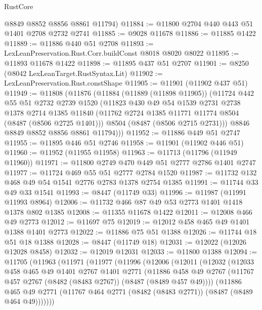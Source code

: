 \begin{lexlean}{RustCore}
\begin{coremodule}
      @8849
      @8852
      @8856
      @8861
      @11794)
@11884 := @11800 @2704 @440 @443 @51 @1401 @2708 @2732 @2741
@11885 := @9028 @11678
@11886 := @11885 @1422
@11889 := @11886 @440 @51 @2708
@11893 := LexLeanPreservation.Rust.Corr.buildConst @8018 @8020 @8022
@11895 := @11893 @11678 @1422
@11898 := @11895 @437 @51 @2707
@11901 := @8250 (@8042 LexLeanTarget.RustSyntax.Lit)
@11902 := LexLeanPreservation.Rust.constShape
@11905 := @11901 (@11902 @437 @51)
@11949 := @11808
    (@11876
      (@11884
        (@11889 (@11898 @11905))
        (@11724
          @442
          @55
          @51
          @2732
          @2739
          @1520
          (@11823
            @430
            @49
            @54
            @1539
            @2731
            @2738
            @1378
            @2714
            @1385
            @11840
            (@11762 @2724 @1385 @11771 @11774 @8504 (@8487 (@8506 @2725 @1401)))
            @8504
            (@8487 (@8506 @2715 @2731)))
          @8846
          @8849
          @8852
          @8856
          @8861
          @11794)))
@11952 := @11886 @449 @51 @2747
@11955 := @11895 @446 @51 @2746
@11958 := @11901 (@11902 @446 @51)
@11960 := @11952 (@11955 @11958)
@11963 := @11713 (@11796 (@11949 @11960))
@11971 := @11800 @2749 @470 @449 @51 @2777 @2786 @1401 @2747
@11977 := @11724 @469 @55 @51 @2777 @2784 @1520
@11987 := @11732 @132 @468 @49 @54 @1541 @2776 @2783 @1378 @2754 @1385
@11991 := @11744 @33 @49 @33 @1541
@11993 := @8447 (@11749 @33)
@11996 := @11987 (@11991 @11993 @8964)
@12006 := @11732 @466 @87 @49 @53 @2773 @1401 @1418 @1378 @802 @1385
@12008 := @11355 @11678 @1422
@12011 := @12008 @466 @49 @2773
@12012 := @11697 @75
@12019 := @12012 @458 @465 @49 @1401 @1388 @1401 @2773
@12022 := @11886 @75 @51 @1388
@12026 := @11744 @18 @51 @18 @1388
@12028 := @8447 (@11749 @18)
@12031 := @12022 (@12026 @12028 @8458)
@12032 := @12019 @12031
@12033 := @11800 @1388
@12094 := @11705
    (@11963
      (@11971
        (@11977
          (@11996
            (@12006
              (@12011
                (@12032
                  (@12033
                    @458
                    @465
                    @49
                    @1401
                    @2767
                    @1401
                    @2771
                    (@11886
                      @458
                      @49
                      @2767
                      (@11767 @457 @2767 (@8482 (@8483 @2767)) (@8487 (@8489 @457 @49))))
                    (@11886
                      @465
                      @49
                      @2771
                      (@11767 @464 @2771 (@8482 (@8483 @2771)) (@8487 (@8489 @464 @49)))))))

\end{coremodule}
\end{lexlean}
